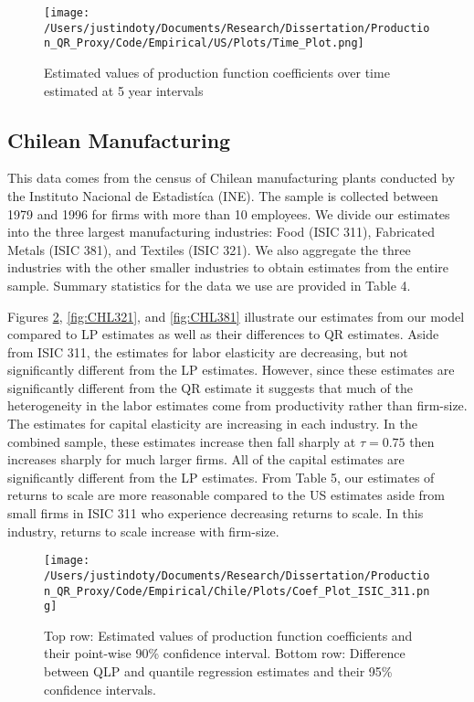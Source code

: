 \documentclass[11pt]{article}
\begin{document}
\begin{figure}[H]
\centering
\texttt{[image: /Users/justindoty/Documents/Research/Dissertation/Production\_QR\_Proxy/Code/Empirical/US/Plots/Time\_Plot.png]}
\caption{Estimated values of production function coefficients over time estimated at 5 year intervals}
\label{fig:UStimecoef}
\end{figure}



\subsection{Chilean Manufacturing}
This data comes from the census of Chilean manufacturing plants conducted by the Instituto Nacional de Estadist\'ica (INE). The sample is collected between 1979 and 1996 for firms with more than 10 employees. We divide our estimates into the three largest manufacturing industries: Food (ISIC 311), Fabricated Metals (ISIC 381), and Textiles (ISIC 321). We also aggregate the three industries with the other smaller industries to obtain estimates from the entire sample. Summary statistics for the data we use are provided in Table 4.

Figures \ref{fig:CHL311}, \ref{fig:CHL321}, and \ref{fig:CHL381} illustrate our estimates from our model compared to LP estimates as well as their differences to QR estimates. Aside from ISIC 311, the estimates for labor elasticity are decreasing, but not significantly different from the LP estimates. However, since these estimates are significantly different from the QR estimate it suggests that much of the heterogeneity in the labor estimates come from productivity rather than firm-size. The estimates for capital elasticity are increasing in each industry. In the combined sample, these estimates increase then fall sharply at $\tau=0.75$ then increases sharply for much larger firms. All of the capital estimates are significantly different from the LP estimates. From Table 5, our estimates of returns to scale are more reasonable compared to the US estimates aside from small firms in ISIC 311 who experience decreasing returns to scale. In this industry, returns to scale increase with firm-size.


  

\begin{figure}[H]
\centering
\texttt{[image: /Users/justindoty/Documents/Research/Dissertation/Production\_QR\_Proxy/Code/Empirical/Chile/Plots/Coef\_Plot\_ISIC\_311.png]}
\caption{Top row: Estimated values of production function coefficients and their point-wise 90\% confidence interval. Bottom row: Difference between QLP and quantile regression estimates and their 95\% confidence intervals.}
\label{fig:CHL311}
\end{figure}
\end{document}
